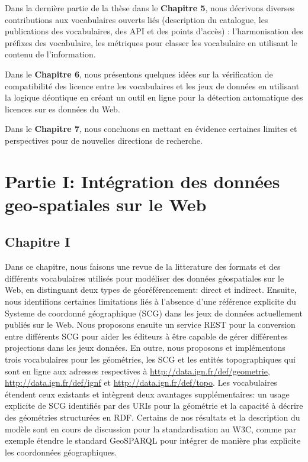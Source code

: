 \documentclass[a4paper,11pt,twoside]{report}
\begin{document}
Dans la dernière partie de la thèse dans le \textbf{Chapitre 5}, nous décrivons diverses contributions aux vocabulaires ouverts liés (description du catalogue, les publications des vocabulaires, des API et des points d'accès) : l'harmonisation des préfixes des vocabulaire, les métriques pour classer les vocabulaire  en utilisant le contenu de l'information.

Dans le \textbf{Chapitre 6}, nous présentons quelques idées sur la vérification de compatibilité des licence entre les vocabulaires et les jeux de données en utilisant la logique déontique en créant un outil en ligne pour la détection automatique des licences sur es données du Web.

Dans le \textbf{Chapitre 7}, nous concluons en mettant en évidence certaines limites et perspectives pour de nouvelles directions de recherche.

\chapter*{Partie I: Intégration des données geo-spatiales sur le Web}

\section*{Chapitre I}
Dans ce chapitre, nous faisons une revue de la litterature des formats et des différents vocabulaires utilisés pour modéliser des données géospatiales sur le Web, en distinguant deux types de géoréférencement: direct et indirect. Ensuite, nous identifions certaines limitations liés à l'absence d'une référence explicite du Systeme de coordonné géographique (SCG) dans les jeux de données actuellement publiés sur le Web. Nous proposons ensuite un service REST pour la conversion entre différents SCG pour aider les éditeurs à être capable de gérer différentes projections dans les jeux données. En outre, nous proposons et implémentons trois vocabulaires pour les géométries, les SCG et les entités topographiques qui sont en ligne aux adresses respectives à \url{http://data.ign.fr/def/geometrie}, \url{http://data.ign.fr/def/ignf} et \url{http://data.ign.fr/def/topo}. Les vocabulaires étendent ceux existants et intègrent deux avantages supplémentaires: un usage explicite de SCG identifiés par des URIs pour la géométrie et la capacité à décrire des géométries structurées en RDF. Certains de nos résultats et la description du modèle sont en cours de discussion pour la standardisation au W3C, comme par exemple étendre le standard  GeoSPARQL pour intégrer de manière plus explicite les coordonnées géographiques.
\end{document}
